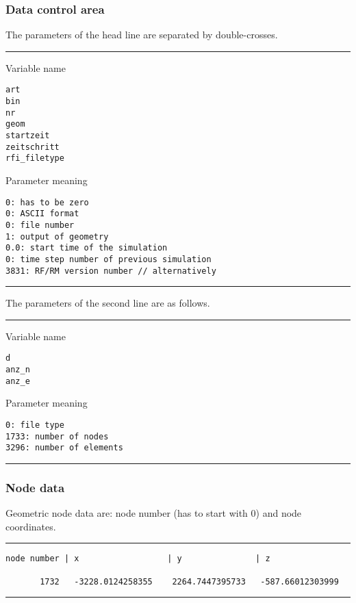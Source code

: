 \newpage
\subsubsection{Data control area}

The parameters of the head line are separated by double-crosses.

\small
\hrule
\begin{minipage}[t]{4cm}
Variable name
\begin{verbatim}
art
bin
nr
geom
startzeit
zeitschritt
rfi_filetype
\end{verbatim}
\end{minipage}
%
\begin{minipage}[t]{4cm}
Parameter meaning
\begin{verbatim}
0: has to be zero
0: ASCII format
0: file number
1: output of geometry
0.0: start time of the simulation
0: time step number of previous simulation
3831: RF/RM version number // alternatively
\end{verbatim}
\end{minipage}
\hrule
\normalsize

\bigskip
The parameters of the second line are as follows.

\small
\hrule
\begin{minipage}[t]{4cm}
Variable name
\begin{verbatim}
d
anz_n
anz_e
\end{verbatim}
\end{minipage}
%
\begin{minipage}[t]{4cm}
Parameter meaning
\begin{verbatim}
0: file type
1733: number of nodes
3296: number of elements
\end{verbatim}
\end{minipage}
\hrule
\normalsize


\subsubsection{Node data}

Geometric node data are: node number (has to start with 0) and node
coordinates.

\small
\hrule
\begin{minipage}[t]{4cm}
\begin{verbatim}
node number | x                  | y               | z

       1732   -3228.0124258355    2264.7447395733   -587.66012303999

\end{verbatim}
\end{minipage}
\hrule
\normalsize

